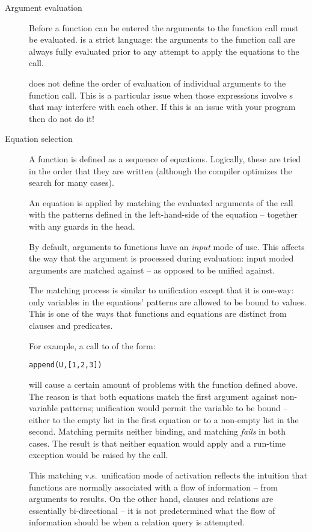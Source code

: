 \begin{description}
\item[Argument evaluation]
Before a function can be entered the arguments to the function call must be evaluated. \go is a strict language: the arguments to the function call are always fully evaluated prior to any attempt to apply the equations to the call.

\go does not define the order of evaluation of individual arguments to the function call. This is a particular issue when those expressions involve s that may interfere with each other. If this is an issue with your program then do not do it!

\item[Equation selection]
A function is defined as a sequence of equations. Logically, these are tried in the order that they are written (although the compiler optimizes the search for many cases).

An equation is applied by matching the evaluated arguments of the call with the patterns defined in the left-hand-side of the equation -- together with any guards in the head.

By default, arguments to functions have an \emph{input} mode of use. This affects the way that the argument is processed during evaluation: input moded arguments are matched against -- as opposed to be unified against.

The matching process is similar to unification except that it is one-way: only variables in the equations' patterns are allowed to be bound to values. This is one of the ways that functions and equations are distinct from clauses and predicates.

For example, a call to  of the form:
\begin{alltt}
append(U,[1,2,3])
\end{alltt}
will cause a certain amount of problems with the  function defined above. The reason is that both  equations match the first argument against non-variable patterns; unification would permit the variable  to be bound -- either to the empty list in the first equation or to a non-empty list in the second. Matching permits neither binding, and matching \emph{fails} in both cases. The result is that neither equation would apply and a run-time exception would be raised by the call.

This matching v.s.~unification mode of activation reflects the intuition that functions are normally associated with a flow of information -- from arguments to results. On the other hand, clauses and relations are essentially bi-directional -- it is not predetermined what the flow of information should be when a relation query is attempted.


\end{description}
